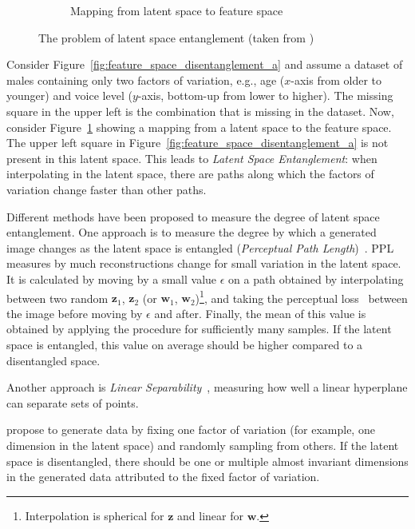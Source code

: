 \begin{figure}
\begin{subfigure}{.3\textwidth}
        \caption{Mapping from latent space to feature space}
        \label{fig:feature_space_disentanglement_b}
    \end{subfigure}
    \caption[Latent Space Entanglement]{The problem of latent space entanglement (taken from \citet{karras2019style})}
    \label{fig:feature_space_disentanglement}
\end{figure}

Consider Figure~\ref{fig:feature_space_disentanglement_a} and assume a dataset of males containing only two factors of variation, e.g., age ($x$-axis from older to younger) and voice level ($y$-axis, bottom-up from lower to higher).
The missing square in the upper left is the combination  that is missing in the dataset.
Now, consider Figure~\ref{fig:feature_space_disentanglement_b} showing a mapping from a latent space to the feature space.
The upper left square in Figure~\ref{fig:feature_space_disentanglement_a} is not present in this latent space.
This leads to \textit{Latent Space Entanglement}: when interpolating in the latent space, there are paths along which the factors of variation change faster than other paths.

Different methods have been proposed to measure the degree of latent space entanglement.
One approach is to measure the degree by which a generated image changes as the latent space is entangled (\textit{Perceptual Path Length})~\citep{karras2019style}.
\ac{PPL} measures by much reconstructions change for small variation in the latent space.
It is calculated by moving by a small value $\epsilon$ on a path obtained by interpolating between two random $\bm{z}_1$, $\bm{z}_2$ (or $\bm{w}_1$, $\bm{w}_2$)\footnote{Interpolation is spherical for $\bm{z}$ and linear for $\bm{w}$.}, and taking the perceptual loss~\citep{johnson2016perceptual} between the image before moving by $\epsilon$ and after.
Finally, the mean of this value is obtained by applying the procedure for sufficiently many samples.
If the latent space is entangled, this value on average should be higher compared to a disentangled space.

Another approach is \textit{Linear Separability}~\citep{karras2019style}, measuring how well a linear hyperplane can separate sets of points.

\citet{kim2018disentangling} propose to generate data by fixing one factor of variation (for example, one dimension in the latent space) and randomly sampling from others.
If the latent space is disentangled, there should be one or multiple almost invariant dimensions in the generated data attributed to the fixed factor of variation.


